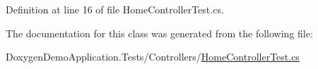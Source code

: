 Definition at line 16 of file Home\+Controller\+Test.\+cs.



The documentation for this class was generated from the following file\+:\begin{DoxyCompactItemize}
\item 
Doxygen\+Demo\+Application.\+Tests/\+Controllers/\mbox{\hyperlink{_home_controller_test_8cs}{Home\+Controller\+Test.\+cs}}\end{DoxyCompactItemize}
